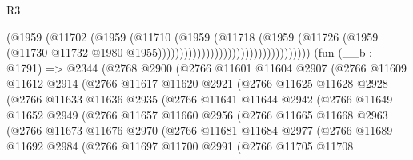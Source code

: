 \begin{lexlean}{R3}
\begin{coremodule}
                                                      (@1959
                                                        (@11702
                                                          (@1959
                                                            (@11710
                                                              (@1959
                                                                (@11718
                                                                  (@1959
                                                                    (@11726
                                                                      (@1959
                                                                        (@11730
                                                                          @11732
                                                                          @1980
                                                                          @1955)))))))))))))))))))))))))))))))))))
    (fun (__b : @1791) =>
    @2344
      (@2768
        @2900
        (@2766
          @11601
          @11604
          @2907
          (@2766
            @11609
            @11612
            @2914
            (@2766
              @11617
              @11620
              @2921
              (@2766
                @11625
                @11628
                @2928
                (@2766
                  @11633
                  @11636
                  @2935
                  (@2766
                    @11641
                    @11644
                    @2942
                    (@2766
                      @11649
                      @11652
                      @2949
                      (@2766
                        @11657
                        @11660
                        @2956
                        (@2766
                          @11665
                          @11668
                          @2963
                          (@2766
                            @11673
                            @11676
                            @2970
                            (@2766
                              @11681
                              @11684
                              @2977
                              (@2766
                                @11689
                                @11692
                                @2984
                                (@2766
                                  @11697
                                  @11700
                                  @2991
                                  (@2766
                                    @11705
                                    @11708

\end{coremodule}
\end{lexlean}
